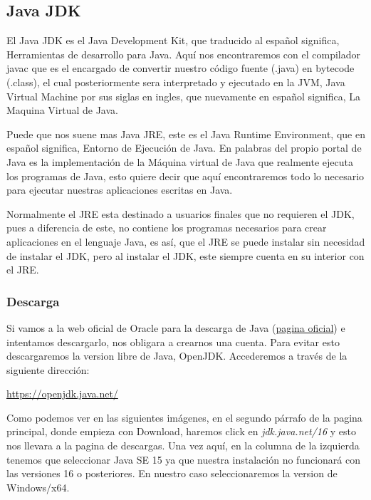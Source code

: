 \documentclass[a4paper,10pt]{article}
\begin{document}
 \clearpage

\subsection{Java JDK}

El Java JDK es el Java Development Kit, que traducido al español significa, Herramientas de desarrollo para Java. Aquí nos encontraremos con el compilador javac que es el encargado de convertir nuestro código fuente (.java) en bytecode (.class), el cual posteriormente sera interpretado y ejecutado en la JVM, Java Virtual Machine por sus siglas en ingles, que nuevamente en español significa, La Maquina Virtual de Java. 

Puede que nos suene mas Java JRE, este es el Java Runtime Environment, que en español significa, Entorno de Ejecución de Java. En palabras del propio portal de Java es la implementación de la Máquina virtual de Java que realmente ejecuta los programas de Java, esto quiere decir que aquí encontraremos todo lo necesario para ejecutar nuestras aplicaciones escritas en Java. 

Normalmente el JRE esta destinado a usuarios finales que no requieren el JDK, pues a diferencia de este, no contiene los programas necesarios para crear aplicaciones en el lenguaje Java, es así, que el JRE se puede instalar sin necesidad de instalar el JDK, pero al instalar el JDK, este siempre cuenta en su interior con el JRE.

\subsubsection{Descarga}

Si vamos a la web oficial de Oracle para la descarga de Java (\href{https://www.oracle.com/es/java/technologies/javase/javase-jdk8-downloads.html}{pagina oficial}) e intentamos descargarlo, nos obligara a crearnos una cuenta. Para evitar esto descargaremos la version libre de Java, OpenJDK. Accederemos a través de la siguiente dirección:

\begin{center}
\href{https://openjdk.java.net/}{https://openjdk.java.net/} 
\end{center}


Como podemos ver en las siguientes imágenes, en el segundo párrafo de la pagina principal, donde empieza con Download, haremos click  en \textit{jdk.java.net/16} y esto nos llevara a la pagina de descargas. Una vez aquí, en la columna de la izquierda tenemos que seleccionar Java SE 15 ya que nuestra instalación no funcionará con las versiones 16 o posteriores. En nuestro caso seleccionaremos la version de Windows/x64.
\end{document}
